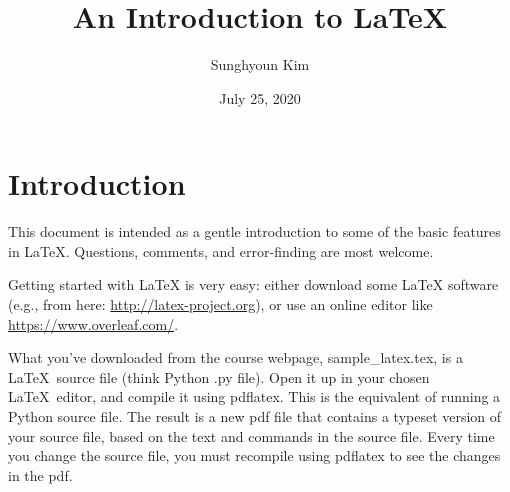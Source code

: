 \documentclass[12pt]{article}
\title{An Introduction to \LaTeX}
\author{Sunghyoun Kim}
\date{July 25, 2020}
\begin{document}
\maketitle

\section{Introduction}
This document is intended as a gentle introduction to some of the basic features in \LaTeX.
Questions, comments, and error-finding are most welcome.



%
%
Getting started with {\LaTeX} is very easy: either download some \LaTeX{} software
(e.g., from here: \url{http://latex-project.org}),
or use an online editor like \url{https://www.overleaf.com/}.

What you've downloaded from the course webpage, sample\_latex.tex, is a \LaTeX\ source file (think Python .py file).
Open it up in your chosen \LaTeX\ editor, and compile it using pdflatex.
This is the equivalent of running a Python source file.
The result is a new pdf file that contains a typeset version of your source file, based on the text and commands in the source file.
Every time you change the source file, you must recompile using pdflatex to see the changes in the pdf.


\newpage
\end{document}
